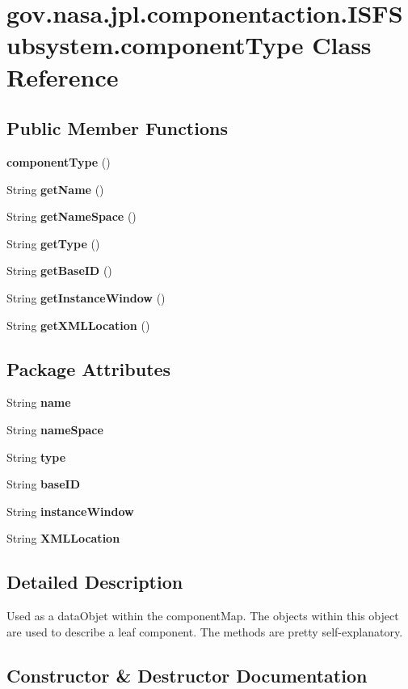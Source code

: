 \section{gov.\+nasa.\+jpl.\+componentaction.\+I\+S\+F\+Subsystem.\+component\+Type Class Reference}
\label{classgov_1_1nasa_1_1jpl_1_1componentaction_1_1_i_s_f_subsystem_1_1component_type}
\subsection*{Public Member Functions}
\begin{DoxyCompactItemize}
\item 
{\bf component\+Type} ()
\item 
String {\bf get\+Name} ()
\item 
String {\bf get\+Name\+Space} ()
\item 
String {\bf get\+Type} ()
\item 
String {\bf get\+Base\+ID} ()
\item 
String {\bf get\+Instance\+Window} ()
\item 
String {\bf get\+X\+M\+L\+Location} ()
\end{DoxyCompactItemize}
\subsection*{Package Attributes}
\begin{DoxyCompactItemize}
\item 
String {\bf name}
\item 
String {\bf name\+Space}
\item 
String {\bf type}
\item 
String {\bf base\+ID}
\item 
String {\bf instance\+Window}
\item 
String {\bf X\+M\+L\+Location}
\end{DoxyCompactItemize}


\subsection{Detailed Description}
Used as a data\+Objet within the component\+Map. The objects within this object are used to describe a leaf component. The methods are pretty self-\/explanatory. 

\subsection{Constructor \& Destructor Documentation}
